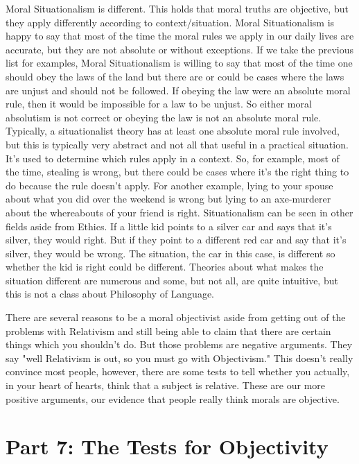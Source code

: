 Moral Situationalism is different. This holds that moral truths are objective, but they apply differently according to context/situation. Moral Situationalism is happy to say that most of the time the moral rules we apply in our daily lives are accurate, but they are not absolute or without exceptions. If we take the previous list for examples, Moral Situationalism is willing to say that most of the time one should obey the laws of the land but there are or could be cases where the laws are unjust and should not be followed. If obeying the law were an absolute moral rule, then it would be impossible for a law to be unjust. So either moral absolutism is not correct or obeying the law is not an absolute moral rule. Typically, a situationalist theory has at least one absolute moral rule involved, but this is typically very abstract and not all that useful in a practical situation. It’s used to determine which rules apply in a context. So, for example, most of the time, stealing is wrong, but there could be cases where it’s the right thing to do because the rule doesn’t apply. For another example, lying to your spouse about what you did over the weekend is wrong but lying to an axe-murderer about the whereabouts of your friend is right. Situationalism can be seen in other fields aside from Ethics. If a little kid points to a silver car and says that it’s silver, they would right. But if they point to a different red car and say that it’s silver, they would be wrong. The situation, the car in this case, is different so whether the kid is right could be different. Theories about what makes the situation different are numerous and some, but not all, are quite intuitive, but this is not a class about Philosophy of Language.

There are several reasons to be a moral objectivist aside from getting out of the problems with Relativism and still being able to claim that there are certain things which you shouldn't do. But those problems are negative arguments. They say "well Relativism is out, so you must go with Objectivism." This doesn't really convince most people, however, there are some tests to tell whether you actually, in your heart of hearts, think that a subject is relative. These are our more positive arguments, our evidence that people really think morals are objective.


\chapter{Part 7: The Tests for Objectivity}
